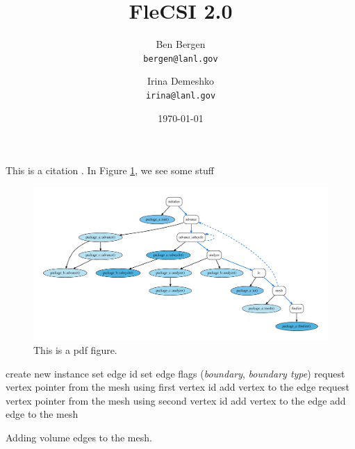 \documentclass{article}
\title{FleCSI 2.0}
\author{
  Ben Bergen\\
  \texttt{bergen@lanl.gov}
  \and
  Irina Demeshko\\
  \texttt{irina@lanl.gov}
}
\date{\today}
\begin{document}
\maketitle




This is a citation \cite{LegeionSC12}.
In Figure \ref{fig:cycle}, we see some stuff

\begin{figure}
\begin{center}
\includegraphics[width=1.0\textwidth]{images/cycle.pdf}
\end{center}
\caption{This is a pdf figure.}
\label{fig:cycle}
\end{figure}


\begin{algorithm}
  \begin{algorithmic}[1]
    \STATE create new instance
    \STATE set edge id
    \STATE set edge flags (\emph{boundary}, \emph{boundary type})
    \STATE request vertex pointer from the mesh using first vertex id
    \STATE add vertex to the edge
    \STATE request vertex pointer from the mesh using second vertex id
    \STATE add vertex to the edge
    \STATE add edge to the mesh
    \ENDFOR
  \end{algorithmic}
  \caption{Adding volume edges to the mesh.}
  \label{algo:volume_edge_assembly}
\end{algorithm}
\end{document}
